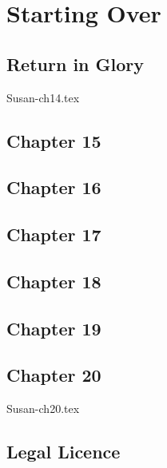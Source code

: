 \documentclass[12pt,twoside,onecolumn,openright,extrafontsizes]{memoir}
\begin{document}
\part{Starting Over}
	\chapter{Return in Glory}
	 {Susan-ch14.tex}
	\chapter{Chapter 15}
	\lipsum[81-100]
	\chapter{Chapter 16}
	\lipsum[101-120]
	\chapter{Chapter 17}
	\lipsum[121-140]
	\chapter{Chapter 18}
	\lipsum[141-160]
	\chapter{Chapter 19}
	\lipsum[61-80]
	\chapter{Chapter 20}
	 {Susan-ch20.tex}




\chapter{Legal Licence}


\end{document}
